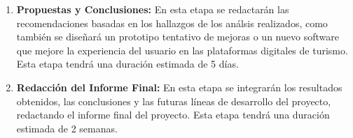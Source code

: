 \documentclass[12pt, letterpaper]{report} %
\begin{document}
\begin{enumerate}
        \item \textbf{Propuestas y Conclusiones:} En esta etapa se redactarán las recomendaciones basadas en los hallazgos de los análsis realizados, como también
                se diseñará un prototipo tentativo de mejoras o un nuevo software que mejore la experiencia del usuario en las plataformas digitales de turismo. 
                Esta etapa tendrá una duración estimada de 5 días.
                
        \item \textbf{Redacción del Informe Final:} En esta etapa se integrarán los resultados obtenidos, las conclusiones y las futuras líneas de desarrollo del proyecto,
                redactando el informe final del proyecto. Esta etapa tendrá una duración estimada de 2 semanas.
    \end{enumerate}

    \printbibliography[title={Referencias}, heading=bibliography]
\end{document}
